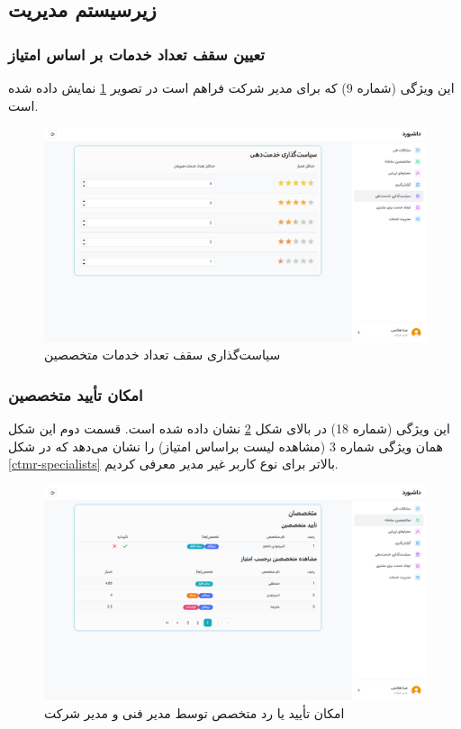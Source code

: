 \subsection{زیرسیستم مدیریت}

\subsubsection{تعیین سقف تعداد خدمات بر اساس امتیاز}
این ویژگی (شماره 9) که برای مدیر شرکت فراهم است در تصویر
\ref{policy}
نمایش داده شده است.

\begin{figure}[h]
	\centering
	\includegraphics[width=\textwidth]{figs/initial-ui/service-policy}
	\caption{سیاست‌گذاری سقف تعداد خدمات متخصصین}
	\label{policy}
\end{figure}


\subsubsection{امکان تأیید متخصصین}
این ویژگی (شماره 18) در بالای شکل
\ref{mngr-specialists}
نشان داده شده است. قسمت دوم این شکل همان ویژگی شماره 3 (مشاهده لیست براساس امتیاز) را نشان می‌دهد که در شکل
\ref{ctmr-specialists}
بالاتر برای نوع کاربر غیر مدیر معرفی کردیم.

\begin{figure}[h]
	\centering
	\includegraphics[width=\textwidth]{figs/initial-ui/mngr-specialists}
	\caption{امکان تأیید یا رد متخصص توسط مدیر فنی و مدیر شرکت}
	\label{mngr-specialists}
\end{figure}










